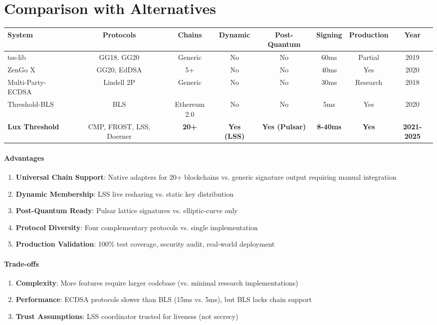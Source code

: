 \section{Comparison with Alternatives}


\begin{table}[t]
\centering
\small
\begin{tabular}{@{}lccccccc@{}}
\toprule
\textbf{System} & \textbf{Protocols} & \textbf{Chains} & \textbf{Dynamic} & \textbf{Post-Quantum} & \textbf{Signing} & \textbf{Production} & \textbf{Year} \\
\midrule
tss-lib \cite{tsslib} & GG18, GG20 & Generic & No & No & 60ms & Partial & 2019 \\
ZenGo X \cite{zengo} & GG20, EdDSA & 5+ & No & No & 40ms & Yes & 2020 \\
Multi-Party-ECDSA \cite{mpecdsa} & Lindell 2P & Generic & No & No & 30ms & Research & 2018 \\
Threshold-BLS \cite{tbls} & BLS & Ethereum 2.0 & No & No & 5ms & Yes & 2020 \\
\midrule
\textbf{Lux Threshold} & CMP, FROST, LSS, Doerner & \textbf{20+} & \textbf{Yes (LSS)} & \textbf{Yes (Pulsar)} & \textbf{8-40ms} & \textbf{Yes} & \textbf{2021-2025} \\
\bottomrule
\end{tabular}

\label{tab:comparison}
\end{table}

\paragraph{Advantages}
\begin{enumerate}
\item \textbf{Universal Chain Support}: Native adapters for 20+ blockchains vs. generic signature output requiring manual integration
\item \textbf{Dynamic Membership}: LSS live resharing vs. static key distribution
\item \textbf{Post-Quantum Ready}: Pulsar lattice signatures vs. elliptic-curve only
\item \textbf{Protocol Diversity}: Four complementary protocols vs. single implementation
\item \textbf{Production Validation}: 100\% test coverage, security audit, real-world deployment
\end{enumerate}

\paragraph{Trade-offs}
\begin{enumerate}
\item \textbf{Complexity}: More features require larger codebase (vs. minimal research implementations)
\item \textbf{Performance}: ECDSA protocols slower than BLS (15ms vs. 5ms), but BLS lacks chain support
\item \textbf{Trust Assumptions}: LSS coordinator trusted for liveness (not secrecy)
\end{enumerate}

